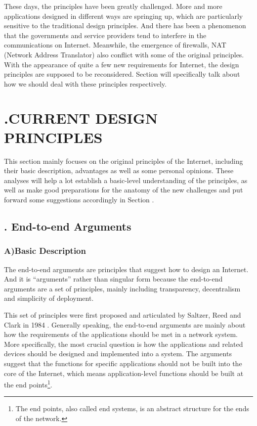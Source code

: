 \documentclass[11pt,twocolumn]{article}
\begin{document}
These days, the principles have been greatly challenged. More and more applications designed in different ways are springing up, which are particularly sensitive to the traditional design principles. And there has been a phenomenon that the governments and service providers tend to interfere in the communications on Internet. Meanwhile, the emergence of firewalls, NAT (Network Address Translator) also conflict with some of the original principles. With the appearance of quite a few new requirements for Internet, the design principles are supposed to be reconsidered. Section \uppercase\expandafter{} will specifically talk about how we should deal with these principles respectively.

\section*{\textbf{\uppercase\expandafter{}.\quad CURRENT DESIGN PRINCIPLES}}
This section mainly focuses on the original principles of the Internet, including their basic description, advantages as well as some personal opinions. These analyses will help a lot establish a basic-level understanding of the principles, as well as make good preparations for the anatomy of the new challenges and put forward some suggestions accordingly in Section \uppercase\expandafter{}.

\subsection*{{}. End-to-end Arguments}
\subsubsection*{A)\quad Basic Description}
The end-to-end arguments are principles that suggest how to design an Internet. And it is ``arguments'' rather than singular form because the end-to-end arguments are a set of principles, mainly including transparency, decentralism and simplicity of deployment.

This set of principles were first proposed and articulated by Saltzer, Reed and Clark in 1984 \cite{e2e}. Generally speaking, the end-to-end arguments are mainly about how the requirements of the applications should be met in a network system. More specifically, the most crucial question is how the applications and related devices should be designed and implemented into a system. The arguments suggest that the functions for specific applications should not be built into the core of the Internet, which means application-level functions should be built at the end points\footnote{The end points, also called end systems, is an abstract structure for the ends of the network.}.
\end{document}
